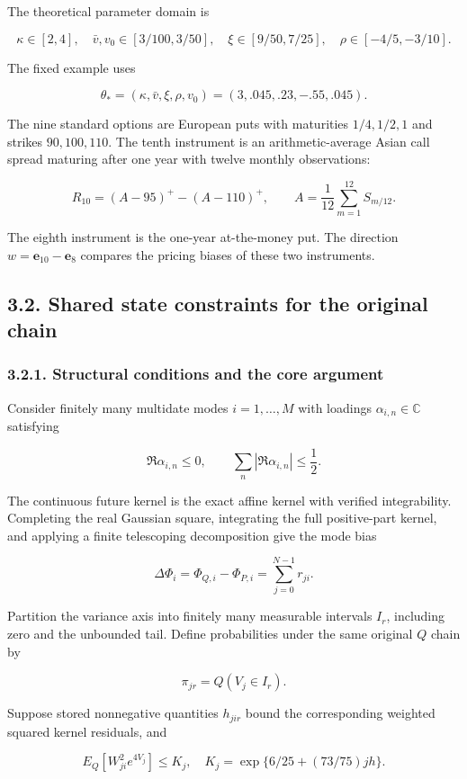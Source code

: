 \documentclass[a4paper,11pt]{article}
\begin{document}
The theoretical parameter domain is

\[
\kappa\in[2,4],\quad \bar v,v_0\in[3/100,3/50],\quad
\xi\in[9/50,7/25],\quad \rho\in[-4/5,-3/10].
\]

The fixed example uses

\[
\theta_*=(\kappa,\bar v,\xi,\rho,v_0)=(3,.045,.23,-.55,.045).
\]

The nine standard options are European puts with maturities $1/4,1/2,1$ and strikes $90,100,110$. The tenth instrument is an arithmetic-average Asian call spread maturing after one year with twelve monthly observations:

\[
R_{10}=(A-95)^+-(A-110)^+,\qquad
A=\frac1{12}\sum_{m=1}^{12}S_{m/12}.
\]

The eighth instrument is the one-year at-the-money put. The direction $w=\mathbf e_{10}-\mathbf e_8$ compares the pricing biases of these two instruments.

\subsection*{3.2. Shared state constraints for the original chain}

\subsubsection*{3.2.1. Structural conditions and the core argument}

Consider finitely many multidate modes $i=1,\ldots,M$ with loadings $\alpha_{i,n}\in\mathbb C$ satisfying

\[
\Re\alpha_{i,n}\le0,\qquad
\sum_n|\Re\alpha_{i,n}|\le\frac12.
\]

The continuous future kernel is the exact affine kernel with verified integrability. Completing the real Gaussian square, integrating the full positive-part kernel, and applying a finite telescoping decomposition give the mode bias

\[
\Delta\Phi_i=\Phi_{Q,i}-\Phi_{P,i}=
\sum_{j=0}^{N-1}r_{ji}.
\]

Partition the variance axis into finitely many measurable intervals $I_r$, including zero and the unbounded tail. Define probabilities under the same original $Q$ chain by

\[
\pi_{jr}=Q(V_j\in I_r).
\]

Suppose stored nonnegative quantities $h_{jir}$ bound the corresponding weighted squared kernel residuals, and

\[
E_Q[W_{ji}^2 e^{4V_j}]\le K_j,
\quad K_j=\exp\{6/25+(73/75)jh\}.
\]
\end{document}
